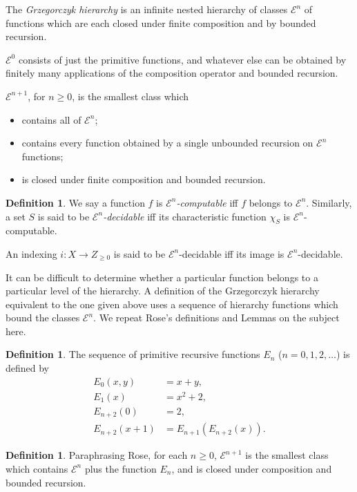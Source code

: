 \documentclass[a4paper]{article}
\newcommand{\grz}[1]{$\mathcal{E}^{#1}$}	%
\theoremstyle{plain}
\theoremstyle{definition}
\newtheorem{definition}[theorem]{Definition}
\begin{document}
The {\it Grzegorczyk hierarchy} is an infinite nested hierarchy of classes \grz{n} of functions which are each closed under finite composition and by bounded recursion. 

\grz{0} consists of just the primitive functions, and whatever else can be obtained by finitely many applications of the composition operator and bounded recursion.

\grz{n+1}, for $n \geq 0$, is the smallest class which

\begin{itemize}
	\item contains all of \grz{n};
	\item contains every function obtained by a single unbounded recursion on \grz{n} functions;
	\item is closed under finite composition and bounded recursion.
\end{itemize}

\begin{definition}
We say a function $f$ is {\it \grz{n}-computable} iff $f$ belongs to \grz{n}. Similarly, a set $S$ is said to be {\it \grz{n}-decidable} iff its characteristic function $\chi_S$ is \grz{n}-computable.

An indexing $i: X \rightarrow Z_{\geq 0}$ is said to be \grz{n}-decidable iff its image is \grz{n}-decidable.

\end{definition}

It can be difficult to determine whether a particular function belongs to a particular level of the hierarchy. A definition of the Grzegorczyk hierarchy equivalent to the one given above uses a sequence of hierarchy functions which bound the classes \grz{n}. We repeat Rose's \cite{Rose_1984} definitions and Lemmas on the subject here.

\begin{definition} \cite{Rose_1984}
The sequence of primitive recursive functions $E_n$ ($n=0,1,2,\dots$) is defined by
\begin{align*}
	E_0(x,y) &= x+y, \\
	E_1(x) &= x^2+2, \\
	E_{n+2}(0) &= 2, \\
	E_{n+2}(x+1) &= E_{n+1}(E_{n+2}(x)).
\end{align*}
\end{definition}

\begin{definition} \cite{Rose_1984}
	Paraphrasing Rose, for each $n \ge 0$, \grz{n+1} is the smallest class which contains \grz{n} plus the function $E_n$, and is closed under composition and bounded recursion.
\end{definition}
\end{document}
